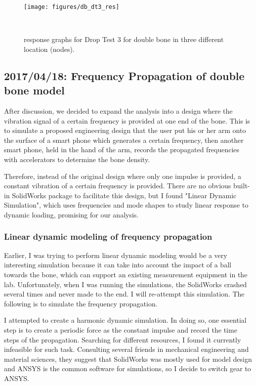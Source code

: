 \documentclass{sigchi}
\begin{document}
\begin{figure*}
  \centering
  \texttt{[image: figures/db\_dt3\_res]}
  \caption{response graphs for Drop Test 3 for double bone in three different location (nodes).}
    ~\label{fig:db_dt3_res}
\end{figure*}

\subsection{2017/04/18: Frequency Propagation of double bone model}

After discussion, we decided to expand the analysis into a design where the vibration signal of a certain frequency is provided at one end of the bone. This is to simulate a proposed engineering design that the user put his or her arm onto the surface of a smart phone which generates a certain frequency, then another smart phone, held in the hand of the arm, records the propagated frequencies with accelerators to determine the bone density.

Therefore, instead of the original design where only one impulse is provided, a constant vibration of a certain frequency is provided. There are no obvious built-in SolidWorks package to facilitate this design, but I found "Linear Dynamic Simulation", which uses frequencies and mode shapes to study linear response to dynamic loading, promising for our analysis.

\subsubsection{Linear dynamic modeling of frequency propagation} 

Earlier, I was trying to perform linear dynamic modeling would be a very interesting simulation because it can take into account the impact of a ball towards the bone, which can support an existing measurement equipment in the lab. Unfortunately, when I was running the simulations, the SolidWorks crashed several times and never made to the end. I will re-attempt this simulation. The following is to simulate the frequency propagation.

I attempted to create a harmonic dynamic simulation. In doing so, one essential step is to create a periodic force as the constant impulse and record the time steps of the propagation. Searching for different resources, I found it currently infeasible for such task. Consulting several friends in mechanical engineering and material sciences, they suggest that SolidWorks was mostly used for model design and ANSYS is the common software for simulations, so I decide to switch gear to ANSYS.
\end{document}
